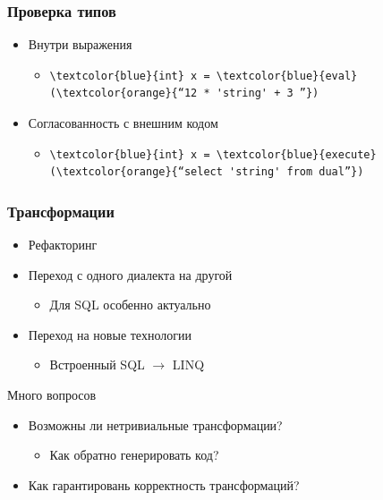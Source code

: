 \documentclass{beamer}
\begin{document}
\begin{frame}[fragile]
	\transwipe[direction=90]
	\frametitle{Проверка типов}
	\begin{itemize}
        \item Внутри выражения
        \begin{itemize}
            \item 
                \begin{Verbatim}[commandchars=\\\{\}]
    \textcolor{blue}{int} x = \textcolor{blue}{eval} (\textcolor{orange}{“12 * 'string' + 3 ”})
                \end{Verbatim}
        \end{itemize}
		\item Согласованность с внешним кодом
    	\begin{itemize}
            \item 
                \begin{Verbatim}[commandchars=\\\{\}]
    \textcolor{blue}{int} x = \textcolor{blue}{execute} (\textcolor{orange}{“select 'string' from dual”})
                \end{Verbatim}
        \end{itemize}
	\end{itemize}
\end{frame}


\begin{frame}
	\transwipe[direction=90]
	\frametitle{Трансформации}
	\begin{itemize}
        \item Рефакторинг
		\item Переход с одного диалекта на другой
    	\begin{itemize}
            \item Для SQL особенно актуально
        \end{itemize}
        \item Переход на новые технологии
    	\begin{itemize}
            \item Встроенный SQL $\rightarrow$ LINQ
        \end{itemize}
	\end{itemize}
    Много вопросов
	\begin{itemize}
		\item Возможны ли нетривиальные трансформации?
    	\begin{itemize}
            \item Как обратно генерировать код?
        \end{itemize}

		\item Как гарантировань корректность трансформаций?
	\end{itemize}
\end{frame}
\end{document}
